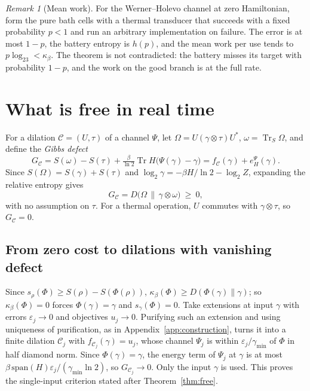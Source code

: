 \documentclass[11pt]{article}
\theoremstyle{definition}
\theoremstyle{remark}
\newtheorem{remark}{Remark}
\newcommand{\Tr}{\operatorname{Tr}}
\newcommand{\Trt}{\kappa_\beta}
\newcommand{\Dil}{\mathcal C}
\begin{document}
\begin{remark}[Mean work]
For the Werner--Holevo channel at zero Hamiltonian, form the pure bath cells with a thermal transducer that succeeds with a fixed probability $p<1$ and run an arbitrary implementation on failure. The error is at most $1-p$, the battery entropy is $h(p)$, and the mean work per use tends to $p\log_23<\Trt$. The theorem is not contradicted: the battery misses its target with probability $1-p$, and the work on the good branch is at the full rate.
\end{remark}

\section{What is free in real time}\label{app:zero-set}

For a dilation $\Dil=(U,\tau)$ of a channel $\Psi$, let $\Omega=U(\gamma\otimes\tau)U^*$, $\omega=\Tr_S\Omega$, and define the \emph{Gibbs defect}
\[
G_{\Dil}=S(\omega)-S(\tau)+\tfrac{\beta}{\ln2}\Tr H\bigl(\Psi(\gamma)-\gamma\bigr)=f_{\Dil}(\gamma)+e_H^\Psi(\gamma).
\]
Since $S(\Omega)=S(\gamma)+S(\tau)$ and $\log_2\gamma=-\beta H/\ln2-\log_2Z$, expanding the relative entropy gives
\begin{equation}\label{eq:defect}
G_{\Dil}=D\bigl(\Omega\,\big\|\,\gamma\otimes\omega\bigr)\ \ge\ 0,
\end{equation}
with no assumption on $\tau$. For a thermal operation, $U$ commutes with $\gamma\otimes\tau$, so $G_{\Dil}=0$.

\subsection{From zero cost to dilations with vanishing defect}

Since $s_\rho(\Phi)\ge S(\rho)-S(\Phi(\rho))$, $\Trt(\Phi)\ge D(\Phi(\gamma)\|\gamma)$; so $\Trt(\Phi)=0$ forces $\Phi(\gamma)=\gamma$ and $s_\gamma(\Phi)=0$. Take extensions at input $\gamma$ with errors $\varepsilon_j\to0$ and objectives $u_j\to0$. Purifying such an extension and using uniqueness of purification, as in Appendix~\ref{app:construction}, turns it into a finite dilation $\Dil_j$ with $f_{\Dil_j}(\gamma)=u_j$, whose channel $\Psi_j$ is within $\varepsilon_j/\gamma_{\min}$ of $\Phi$ in half diamond norm. Since $\Phi(\gamma)=\gamma$, the energy term of $\Psi_j$ at $\gamma$ is at most $\beta\,\mathrm{span}(H)\varepsilon_j/(\gamma_{\min}\ln2)$, so $G_{\Dil_j}\to0$. Only the input $\gamma$ is used. This proves the single-input criterion stated after Theorem~\ref{thm:free}.
\end{document}
